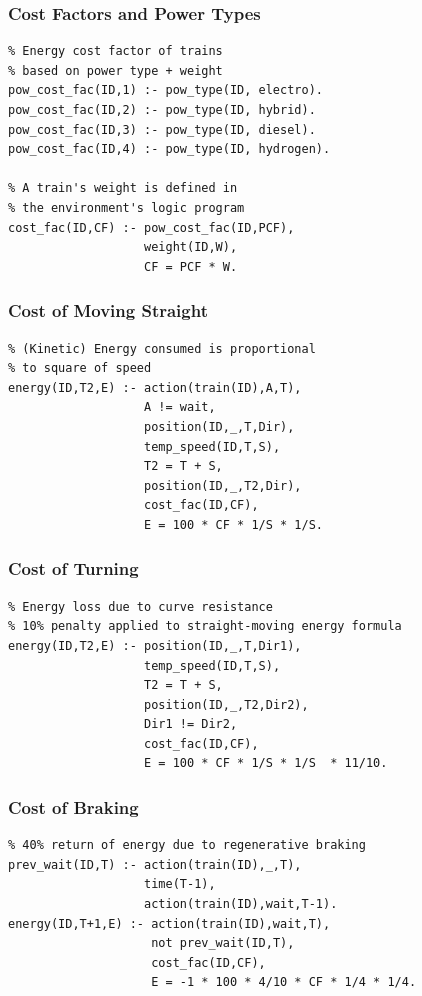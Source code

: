 \documentclass{beamer}
\begin{document}
\begin{frame}[fragile]
\frametitle{Cost Factors and Power Types}
\begin{verbatim}
% Energy cost factor of trains
% based on power type + weight
pow_cost_fac(ID,1) :- pow_type(ID, electro).
pow_cost_fac(ID,2) :- pow_type(ID, hybrid).
pow_cost_fac(ID,3) :- pow_type(ID, diesel).
pow_cost_fac(ID,4) :- pow_type(ID, hydrogen).

% A train's weight is defined in
% the environment's logic program
cost_fac(ID,CF) :- pow_cost_fac(ID,PCF),
                   weight(ID,W),
                   CF = PCF * W.
\end{verbatim}
\end{frame}

\begin{frame}[fragile]
\frametitle{Cost of Moving Straight}
\begin{verbatim}
% (Kinetic) Energy consumed is proportional
% to square of speed
energy(ID,T2,E) :- action(train(ID),A,T),
                   A != wait,
                   position(ID,_,T,Dir),
                   temp_speed(ID,T,S),
                   T2 = T + S,
                   position(ID,_,T2,Dir),
                   cost_fac(ID,CF),
                   E = 100 * CF * 1/S * 1/S.
\end{verbatim}
\end{frame}

\begin{frame}[fragile]
\frametitle{Cost of Turning}
\begin{verbatim}
% Energy loss due to curve resistance
% 10% penalty applied to straight-moving energy formula
energy(ID,T2,E) :- position(ID,_,T,Dir1),
                   temp_speed(ID,T,S),
                   T2 = T + S,
                   position(ID,_,T2,Dir2),
                   Dir1 != Dir2,
                   cost_fac(ID,CF),
                   E = 100 * CF * 1/S * 1/S  * 11/10.
\end{verbatim}
\end{frame}

\begin{frame}[fragile]
\frametitle{Cost of Braking}
\begin{verbatim}
% 40% return of energy due to regenerative braking
prev_wait(ID,T) :- action(train(ID),_,T),
                   time(T-1),
                   action(train(ID),wait,T-1).
energy(ID,T+1,E) :- action(train(ID),wait,T),
                    not prev_wait(ID,T),
                    cost_fac(ID,CF),
                    E = -1 * 100 * 4/10 * CF * 1/4 * 1/4.
\end{verbatim}
\end{frame}
\end{document}
